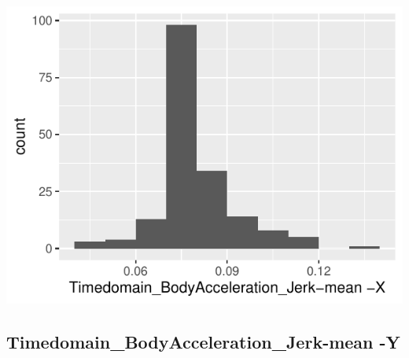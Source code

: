 \documentclass[
]{article}
\begin{document}
\begin{minipage}{0.25 \textwidth}

\includegraphics{codebook_tidydatasub_files/figure-latex/Var-15-Timedomain-BodyAcceleration-Jerk-mean--X-1.pdf}

\end{minipage}

\noindent\makebox[\linewidth]{\rule{\textwidth}{0.4pt}}

\hypertarget{timedomain_bodyacceleration_jerk-mean--y}{%
\subsection{Timedomain\_BodyAcceleration\_Jerk-mean
-Y}\label{timedomain_bodyacceleration_jerk-mean--y}}
\end{document}
